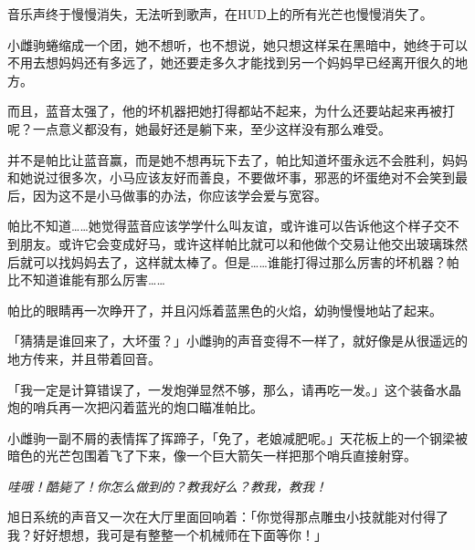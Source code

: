 音乐声终于慢慢消失，无法听到歌声，在HUD上的所有光芒也慢慢消失了。

\horizonline

\unknowndaytimeplace


小雌驹蜷缩成一个团，她不想听，也不想说，她只想这样呆在黑暗中，她终于可以不用去想妈妈还有多远了，她还要走多久才能找到另一个妈妈早已经离开很久的地方。

而且，蓝音太强了，他的坏机器把她打得都站不起来，为什么还要站起来再被打呢？一点意义都没有，她最好还是躺下来，至少这样没有那么难受。


并不是帕比让蓝音赢，而是她不想再玩下去了，帕比知道坏蛋永远不会胜利，妈妈和她说过很多次，小马应该友好而善良，不要做坏事，邪恶的坏蛋绝对不会笑到最后，因为这不是小马做事的办法，你应该学会爱与宽容。


帕比不知道……她觉得蓝音应该学学什么叫友谊，或许谁可以告诉他这个样子交不到朋友。或许它会变成好马，或许这样帕比就可以和他做个交易让他交出玻璃珠然后就可以找妈妈去了，这样就太棒了。但是……谁能打得过那么厉害的坏机器？帕比不知道谁能有那么厉害……{}


\horizonline


帕比的眼睛再一次睁开了，并且闪烁着蓝黑色的火焰，幼驹慢慢地站了起来。

「猜猜是谁回来了，大坏蛋？」小雌驹的声音变得不一样了，就好像是从很遥远的地方传来，并且带着回音。

「我一定是计算错误了，一发炮弹显然不够，那么，请再吃一发。」这个装备水晶炮的哨兵再一次把闪着蓝光的炮口瞄准帕比。

小雌驹一副不屑的表情挥了挥蹄子，「免了，老娘减肥呢。」天花板上的一个钢梁被暗色的光芒包围着飞了下来，像一个巨大箭矢一样把那个哨兵直接射穿。

\emph{哇哦！酷毙了！你怎么做到的？教我好么？教我，教我！}

旭日系统的声音又一次在大厅里面回响着：「你觉得那点雕虫小技就能对付得了我？好好想想，我可是有整整一个机械师在下面等你！」

